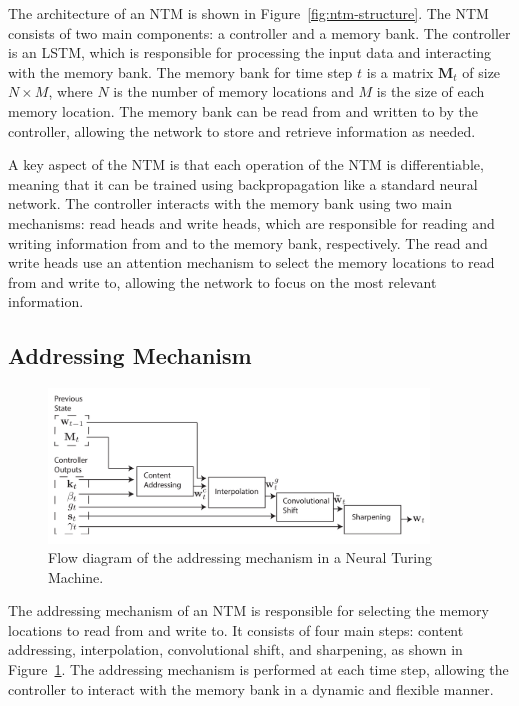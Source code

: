\documentclass{article}
\newcommand{\reffig}[1]{Figure~\ref{#1}}
\begin{document}
The architecture of an NTM is shown in \reffig{fig:ntm-structure}. The NTM consists of two
main components: a controller and a memory bank. The controller is an LSTM, which is
responsible for processing the input data and interacting with the memory bank. The memory
bank for time step $t$ is a matrix $\textbf{M}_t$ of size $N \times M$, where $N$ is the
number of memory locations and $M$ is the size of each memory location. The memory bank
can be read from and written to by the controller, allowing the network to store and
retrieve information as needed.

A key aspect of the NTM is that each operation of the NTM is differentiable, meaning that
it can be trained using backpropagation like a standard neural network. The controller
interacts with the memory bank using two main mechanisms: read heads and write heads,
which are responsible for reading and writing information from and to the memory bank,
respectively. The read and write heads use an attention mechanism to select the memory
locations to read from and write to, allowing the network to focus on the most relevant
information.


\subsection{Addressing Mechanism}
\label{sec:4.1}

\begin{figure}[htbp]
  \centering
  \includegraphics[width=0.9\textwidth]{ntm_addr_4.png}
  \caption{Flow diagram of the addressing mechanism in a Neural Turing Machine.
    \cite{gravesNeuralTuringMachines2014}}
  \label{fig:ntm-addressing}
\end{figure}

The addressing mechanism of an NTM is responsible for selecting the memory locations to
read from and write to. It consists of four main steps: content addressing, interpolation,
convolutional shift, and sharpening, as shown in \reffig{fig:ntm-addressing}. The
addressing mechanism is performed at each time step, allowing the controller to interact
with the memory bank in a dynamic and flexible manner.
\end{document}
